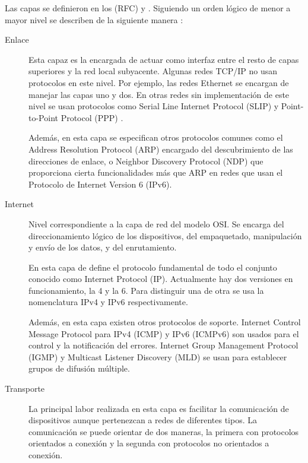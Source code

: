 Las capas se definieron en los  (RFC)
\cite{rfc1122} y \cite{rfc1123}. Siguiendo un orden lógico de menor a mayor
nivel se describen de la siguiente manera \cite{kozierok2005}:
\begin{description}
  \item[Enlace] Esta capaz es la encargada de actuar como interfaz entre el
  resto de capas superiores y la red local subyacente. Algunas redes TCP/IP no 
  usan protocolos en este nivel. Por ejemplo, las redes Ethernet se encargan de
  manejar las capas uno y dos. En otras redes sin implementación de este nivel
  se usan protocolos como Serial Line Internet Protocol (SLIP) \cite{rfc1055} y
  Point-to-Point Protocol (PPP) \cite{rfc1661}.

  Además, en esta capa se especifican otros protocolos comunes como el Address
  Resolution Protocol (ARP) \cite{rfc826} encargado del descubrimiento de las
  direcciones de enlace, o Neighbor Discovery Protocol (NDP) \cite{rfc4861} que
  proporciona cierta funcionalidades más que ARP en redes que usan el
  Protocolo de Internet Version 6 (IPv6).

  \item[Internet] Nivel correspondiente a la capa de red del modelo OSI. Se
  encarga del direccionamiento lógico de los dispositivos, del empaquetado,
  manipulación y envío de los datos, y del enrutamiento.
  
  En esta capa de define el protocolo fundamental de todo el conjunto conocido
  como Internet Protocol (IP). Actualmente hay dos versiones en funcionamiento,
  la 4 y la 6. Para distinguir una de otra se usa la nomenclatura IPv4
  \cite{rfc791} y IPv6 \cite{rfc2460} respectivamente.

  Además, en esta capa existen otros protocolos de soporte. Internet Control
  Message Protocol para IPv4 (ICMP) \cite{rfc792} y IPv6 (ICMPv6) \cite{rfc4443}
  son usados para el control y la notificación del errores. Internet Group
  Management Protocol (IGMP) \cite{rfc4604} y Multicast Listener Discovery (MLD)
  \cite{rfc4604} se usan para establecer grupos de difusión múltiple.

  \item[Transporte] La principal labor realizada en esta capa es facilitar
  la comunicación de dispositivos aunque pertenezcan a redes de diferentes
  tipos. La comunicación se puede orientar de dos maneras, la primera con
  protocolos orientados a conexión y la segunda con protocolos no orientados
  a conexión.


\end{description}
